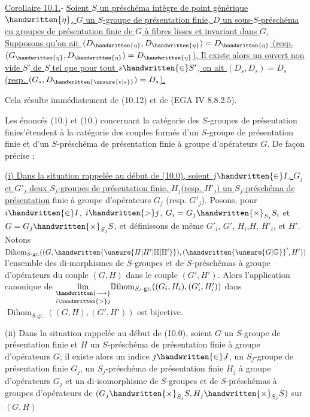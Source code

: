 \uline{Corollaire 10.1.}- \uline{Soient $S$ un préschéma intègre de point générique $\handwritten{\eta}$, $G$ un $S$-groupe de présentation finie, $D$ un sous-$S$-préschéma en groupes de présentation finie de $G$ à fibres lisses et invariant dans $G$. Supposons qu'on ait $(D_{\handwritten{\eta}},D_{\handwritten{\eta}})=D_{\handwritten{\eta}}$ (resp. $(G_{\handwritten{\eta}},D_{\handwritten{\eta}})=D_{\handwritten{\eta}}$). Il existe alors un ouvert non vide $S'$ de $S$ tel que pour tout $s\handwritten{\in}S'$, on ait $(D_s,D_s)=D_s$ (resp. $(G_s,D_{\handwritten{\unsure{e|s}}})=D_s$).}

Cela résulte immédiatement de (10.12) et de (EGA IV 8.8.2.5).

Les énoncés (10.) et (10.) concernant la catégorie des $S$-groupes de présentation finie\handwritten{[}s'étendent à la catégorie des couples formés d'un $S$-groupe de présentation finie et d'un  $S$-préschéma de présentation finie à groupe d'opérateurs $G$. De façon précise :

 \uline{(i) Dans la situation rappelée au début de (10.0), soient $j\handwritten{\in}I$, $G_j$ et $G'_j$ deux $S_j$-groupes de présentation finie, $H_j$(resp. $H'_j$) un $S_j$-préschéma de présentation}
finie à groupe d'opérateurs $G_j$ (resp. $G'_j$). Posons, pour $i\handwritten{\in}I$, $i\handwritten{>}j$, $G_i=G_j\handwritten{\times}_{S_j}S_i$ et $G=G_j\handwritten{\times}_{S_j}S$, et définissons de même $G'_i$, $G'$, $H_i$,$H$, $H'_i$, et $H'$. Notons $\operatorname{Dihom}_{S\text{-gr.}}((G,\handwritten{\unsure{H|H'|\mathbb{H}|\mathbb{H}'}}),(\handwritten{\unsure{G|\mathbb{G}}}',H'))$ l'ensemble des di-morphismes de $S$-groupes et de $S$-préschémas à groupe d'opérateurs du couple $(G,H)$ dans le couple $(G',H')$. Alors l'application canonique de $\underset{i\handwritten{>}j}{\underset{\handwritten{\longrightarrow}}{\lim}}{\mathbb{D}\mathrm{ihom}}_{S_i\text{-gr.}}((G_i,H_i),(G'_i,H'_i))$ dans $\operatorname{Dihom}_{S\text{-gr.}}((G,H),(G',H'))$ est bijective.

(ii) Dans la situation rappelée au début de (10.0), soient $G$ un $S$-groupe  de présentation finie et $H$ un $S$-préschéma de présentation finie à groupe d'opérateurs $G$; il existe alors un indice $j\handwritten{\in}J$, un $S_j$-groupe de présentation finie $G_j$, un $S_j$-préschéma de présentation finie $H_j$ à groupe d'opérateurs $G_j$ et un di-isomorphisme de $S$-groupes et de $S$-préschémas à groupes d'opérateurs de $(G_j\handwritten{\times}_{S_j}S,H_j\handwritten{\times}_{S_j}S)$ sur$(G,H)$

